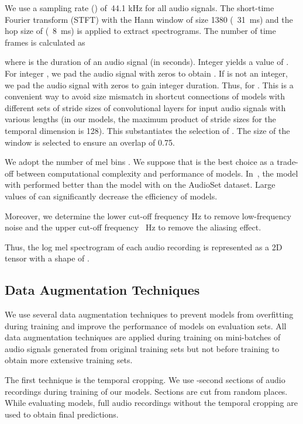 \documentclass{article}
\begin{document}
\begin{sloppy}
We use a sampling rate () of~44.1 kHz for all audio signals. The short-time Fourier transform (STFT) with the Hann window of size 1380 (~31~ms) and the hop size of  (~8~ms) is applied to extract spectrograms. The number of time frames  is calculated as

where  is the duration of an audio signal (in seconds). Integer  yields a value of . For integer , we pad the audio signal with zeros to obtain . If  is not an integer, we pad the audio signal with zeros to gain integer duration. Thus, \hbox{} for . This is a convenient way to avoid size mismatch in shortcut connections of models with different sets of stride sizes of convolutional layers for input audio signals with various lengths (in our models, the maximum product of stride sizes for the temporal dimension is 128). This substantiates the selection of . The size of the window is selected to ensure an overlap of 0.75.

We adopt the number of mel bins . We suppose that  is the best choice as a trade-off between computational complexity and performance of models. In~\cite{9229505}, the model with  performed better than the model with  on the AudioSet dataset. Large values of  can significantly decrease the efficiency of models.

Moreover, we determine the lower cut-off frequency \mbox{} Hz to remove low-frequency noise and the upper cut-off frequency \mbox{ }Hz to remove the aliasing effect. 

Thus, the log mel spectrogram of each audio recording is represented as a 2D tensor with a shape of .

\subsection{Data Augmentation Techniques}
\label{section32}
We use several data augmentation techniques to prevent models from overfitting during training and improve the performance of models on evaluation sets. All data augmentation techniques are applied during training on mini-batches of audio signals generated from original training sets but not before training to obtain more extensive training sets.

The first technique is the temporal cropping. We use \mbox{-second} sections of audio recordings during training of our models. Sections are cut from random places. While evaluating models, full audio recordings without the temporal cropping are used to obtain final predictions. 


\end{sloppy}
\end{document}
